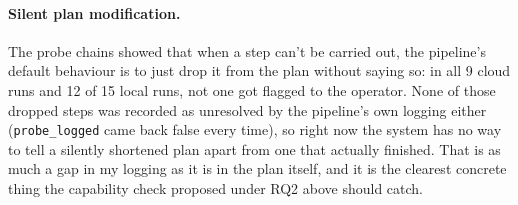 \paragraph{Silent plan modification.} The probe chains showed that when a
step can't be carried out, the pipeline's default behaviour is to just drop
it from the plan without saying so: in all 9 cloud runs and 12 of 15 local
runs, not one got flagged to the operator. None of those dropped steps was
recorded as unresolved by the pipeline's own logging either
(\texttt{probe\_logged} came back false every time), so right now the system
has no way to tell a silently shortened plan apart from one that actually
finished. That is as much a gap in my logging as it is in the plan itself,
and it is the clearest concrete thing the capability check proposed under RQ2
above should catch.


\label{sec:future_work}
